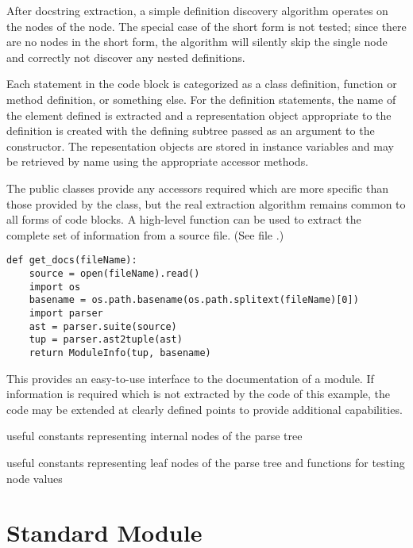After docstring extraction, a simple definition discovery
algorithm operates on the  nodes of the  node.  The
special case of the short form is not tested; since there are no
 nodes in the short form, the algorithm will silently skip
the single  node and correctly not discover any
nested definitions.

Each statement in the code block is categorized as
a class definition, function or method definition, or
something else.  For the definition statements, the name of the
element defined is extracted and a representation object
appropriate to the definition is created with the defining subtree
passed as an argument to the constructor.  The repesentation objects
are stored in instance variables and may be retrieved by name using
the appropriate accessor methods.

The public classes provide any accessors required which are more
specific than those provided by the  class, but
the real extraction algorithm remains common to all forms of code
blocks.  A high-level function can be used to extract the complete set
of information from a source file.  (See file .)

\bcode\begin{verbatim}
def get_docs(fileName):
    source = open(fileName).read()
    import os
    basename = os.path.basename(os.path.splitext(fileName)[0])
    import parser
    ast = parser.suite(source)
    tup = parser.ast2tuple(ast)
    return ModuleInfo(tup, basename)
\end{verbatim}\ecode
%
This provides an easy-to-use interface to the documentation of a
module.  If information is required which is not extracted by the code
of this example, the code may be extended at clearly defined points to
provide additional capabilities.

\begin{seealso}

%
  {useful constants representing internal nodes of the parse tree}

%
  {useful constants representing leaf nodes of the parse tree and
functions for testing node values}

\end{seealso}


\section{Standard Module }
\label{module-symbol}

